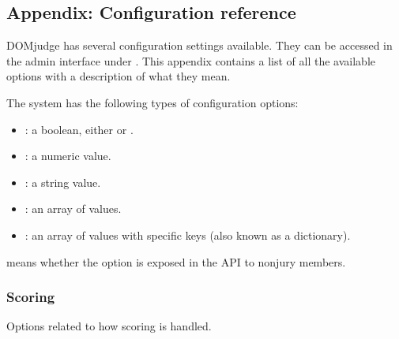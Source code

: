 \documentclass[a4paper,10pt,english,openany]{sphinxmanual}
\begin{document}
\sphinxstepscope


\subsection{Appendix: Configuration reference}
\label{\detokenize{configuration-reference:appendix-configuration-reference}}\label{\detokenize{configuration-reference::doc}}
\sphinxAtStartPar
DOMjudge has several configuration settings available. They can be accessed in
the admin interface under . This appendix contains a
list of all the available options with a description of what they mean.

\sphinxAtStartPar
The system has the following types of configuration options:
\begin{itemize}
\item {} 
\sphinxAtStartPar
{}: a boolean, either  or .

\item {} 
\sphinxAtStartPar
{}: a numeric value.

\item {} 
\sphinxAtStartPar
{}: a string value.

\item {} 
\sphinxAtStartPar
{}: an array of values.

\item {} 
\sphinxAtStartPar
{}: an array of values with specific keys (also known as a dictionary).

\end{itemize}

\sphinxAtStartPar
{} means whether the option is exposed in the API to non\sphinxhyphen{}jury members.


\subsubsection{Scoring}
\label{\detokenize{configuration-reference:scoring}}
\sphinxAtStartPar
Options related to how scoring is handled.
\end{document}
